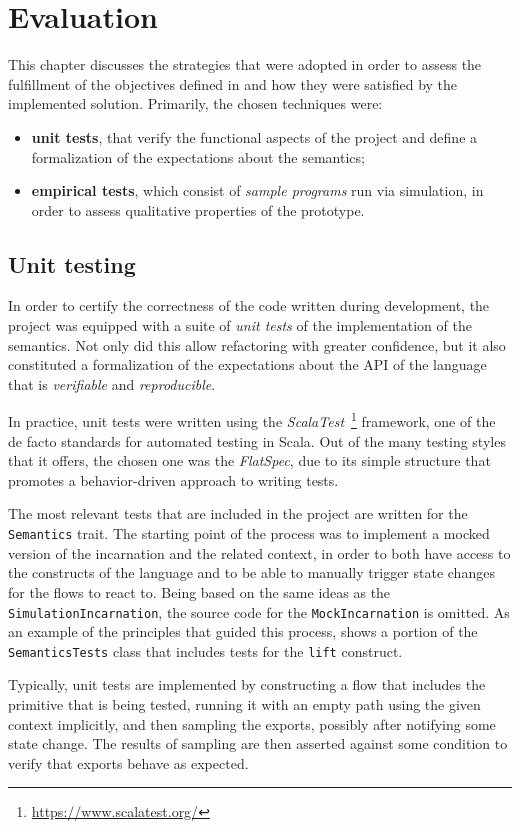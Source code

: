 \chapter{Evaluation}
\label{chap:evaluation}

This chapter discusses the strategies that were adopted in order to assess the fulfillment of the objectives defined in  and how they were satisfied by the implemented solution.
%
Primarily, the chosen techniques were:
%
\begin{itemize}
    \item \textbf{unit tests}, that verify the functional aspects of the project and define a formalization of the expectations about the semantics;
    \item \textbf{empirical tests}, which consist of \textit{sample programs} run via simulation, in order to assess qualitative properties of the prototype.
\end{itemize}

\section{Unit testing}

In order to certify the correctness of the code written during development, the project was equipped with a suite of \textit{unit tests} of the implementation of the semantics.
%
Not only did this allow refactoring with greater confidence, but it also constituted a formalization of the expectations about the API of the language that is \textit{verifiable} and \textit{reproducible}.

In practice, unit tests were written using the \textit{ScalaTest}~\footnote{\url{https://www.scalatest.org/}} framework, one of the de facto standards for automated testing in Scala.
%
Out of the many testing styles that it offers, the chosen one was the \textit{FlatSpec}, due to its simple structure that promotes a behavior-driven approach to writing tests.

The most relevant tests that are included in the project are written for the \texttt{Semantics} trait.
%
The starting point of the process was to implement a mocked version of the incarnation and the related context, in order to both have access to the constructs of the language and to be able to manually trigger state changes for the flows to react to.
%
Being based on the same ideas as the \texttt{SimulationIncarnation}, the source code for the \texttt{MockIncarnation} is omitted.
%
As an example of the principles that guided this process,  shows a portion of the \texttt{SemanticsTests} class that includes tests for the \texttt{lift} construct.
%

%
Typically, unit tests are implemented by constructing a flow that includes the primitive that is being tested, running it with an empty path using the given context implicitly, and then sampling the exports, possibly after notifying some state change.
%
The results of sampling are then asserted against some condition to verify that exports behave as expected.

